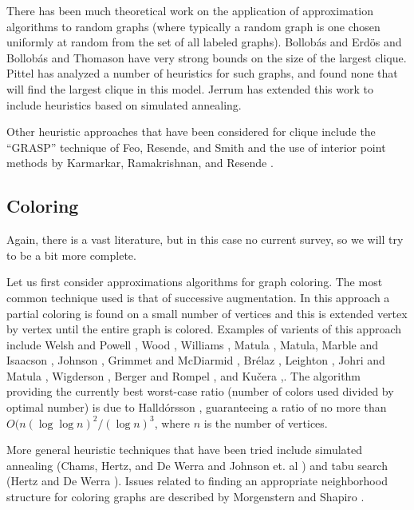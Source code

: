 There has been much theoretical work on the application of approximation
algorithms to random graphs (where typically a random graph is one chosen
uniformly at random from the set of all labeled graphs).
Bollob\'as and Erd\"os \cite{BoEr76} and Bollob\'as and Thomason
\cite{BoTh85} have very strong bounds on the size
of the largest clique.  Pittel \cite{Pi82} has analyzed a number of
heuristics for such graphs, and found none that will find the largest
clique in this model.  Jerrum \cite{Je92} has extended this work to
include heuristics based on simulated annealing.

Other heuristic approaches that have been considered for clique include the
``GRASP'' technique of Feo, Resende, and Smith \cite{FRS93} and the
use of interior point methods by Karmarkar, Ramakrishnan, and Resende
\cite{KRR89}. 

\subsection{Coloring}

Again, there is a vast literature, but in this case no current survey,
so we will try to be a bit more complete.

Let us first consider approximations algorithms for graph coloring.
The most common technique used is that of successive augmentation.
In this approach a partial coloring is found on a small number of
vertices and this is extended vertex by vertex until the entire graph
is colored.  Examples of varients of this approach include Welsh and
Powell \cite{WePo67}, Wood \cite{Wo69}, Williams \cite{Wi70},
Matula \cite{Ma72}, Matula, Marble and Isaacson \cite{MMI72},
Johnson \cite{Jo74a,Jo74b}, Grimmet and McDiarmid \cite{GrMc75}, Br\'elaz
\cite{Br79}, Leighton \cite{Le79}, Johri and Matula \cite{JoMa82},
Wigderson \cite{Wi83}, Berger and Rompel \cite{BeRo90}, and Ku\v cera \cite{Ku91},.
The algorithm providing the currently best worst-case ratio (number
of colors used divided by optimal number) is due to Halld\'orsson
\cite{Ha90}, guaranteeing a ratio of no more than
$O(n(\log\log n)^2 /(\log n)^3$, where $n$ is the number of vertices.

More general heuristic techniques that have been tried include
simulated annealing (Chams, Hertz, and De Werra \cite{CHD87} and
Johnson et. al \cite{JAMS91}) and tabu search (Hertz and De Werra
\cite{HeDe87}).  Issues related to finding an appropriate neighborhood
structure for coloring graphs are described by Morgenstern and Shapiro
\cite{MoSh90}. 


